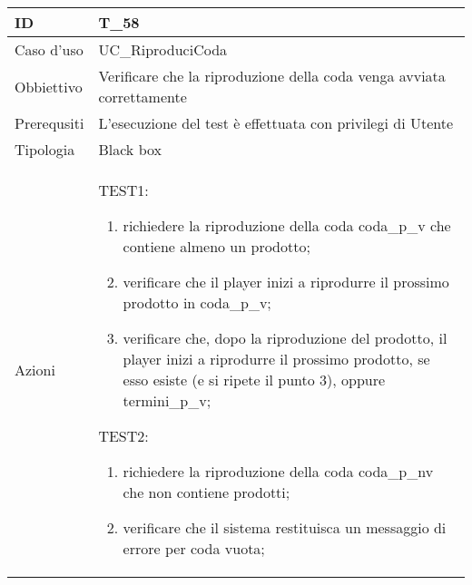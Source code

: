 \begin{table}[hb]
    \centering
    \begin{tabular}{ |p{2cm}|p{10cm}|  }
        \hline
        ID          & T\_58                                                                 \\\hline
        Caso d'uso  & UC\_RiproduciCoda                                                     \\\hline
        Obbiettivo  & Verificare che la riproduzione della coda venga avviata correttamente \\\hline
        Prerequsiti & L'esecuzione del test è effettuata con privilegi di Utente            \\\hline
        Tipologia   & Black box                                                             \\\hline
        Azioni      &
        TEST1:
        \begin{enumerate}[nosep, topsep=0pt]
            \item richiedere la riproduzione della coda coda\_p\_v che contiene almeno un prodotto;
            \item verificare che il player inizi a riprodurre il prossimo prodotto in coda\_p\_v;
            \item verificare che, dopo la riproduzione del prodotto, il player inizi a riprodurre
                  il prossimo prodotto, se esso esiste (e si ripete il punto 3), oppure termini\_p\_v;
        \end{enumerate}
        \vspace{0.5cm} TEST2:
        \begin{enumerate}[nosep, topsep=0pt]
            \item richiedere la riproduzione della coda coda\_p\_nv che non contiene prodotti;
            \item verificare che il sistema restituisca un messaggio di errore per coda vuota;
        \end{enumerate}
        \\\hline
    \end{tabular}
\end{table}

